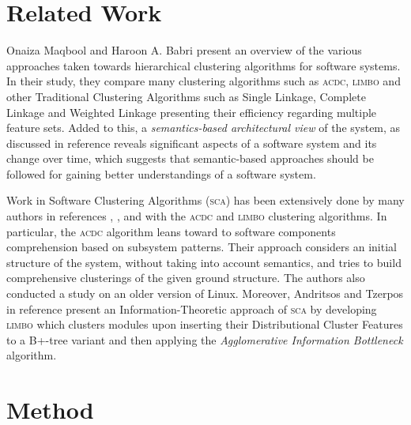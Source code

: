 \documentclass[sigconf, screen]{acmart}
\begin{document}
\section{Related Work}

Onaiza Maqbool and Haroon A. Babri \cite{maqbool_overview} present an
overview of the various approaches taken towards hierarchical clustering algorithms
for software systems. In their study, they compare many clustering algorithms
such as \textsc{acdc}, \textsc{limbo} and other Traditional Clustering Algorithms such as Single
Linkage, Complete Linkage and Weighted Linkage presenting their efficiency regarding 
multiple feature sets. 
Added to this, a \emph{semantics-based architectural view} of the system, as discussed in reference
\cite{large_study} reveals significant aspects of a software system and its change over 
time, which suggests that semantic-based approaches should be followed for gaining better understandings of a software system. 

Work in Software Clustering Algorithms (\textsc{sca}) has been extensively done by many authors in
references \cite{mojo}, \cite{stability}, \cite{acdc} and \cite{limbo} with the \textsc{acdc}
and \textsc{limbo} clustering algorithms. 
In particular, the \textsc{acdc} algorithm leans toward to software components comprehension 
based on subsystem patterns. Their approach considers an initial structure of the system, 
without taking into account semantics, and tries to build comprehensive clusterings of the given ground structure. 
The authors also conducted a study on an older version of  Linux. 
Moreover, Andritsos and Tzerpos in reference \cite{limbo} present an Information-Theoretic 
approach of \textsc{sca} by developing \textsc{limbo} which clusters modules upon inserting their Distributional Cluster Features 
to a B+-tree variant and then applying the \emph{Agglomerative Information Bottleneck} algorithm.


\section{Method} 
\end{document}
